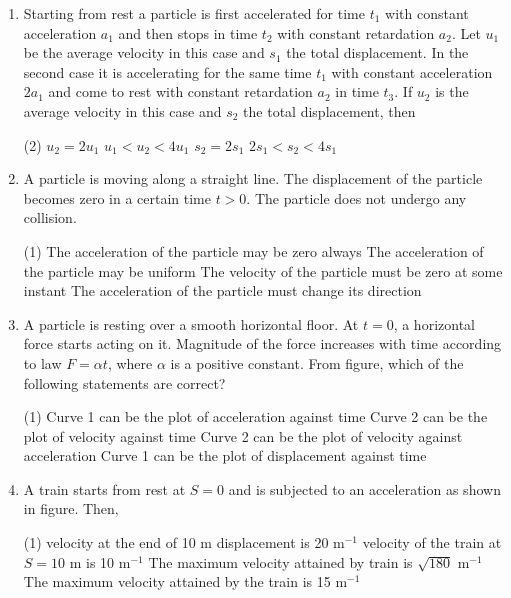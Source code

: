 \documentclass{article}
\begin{document}
\begin{enumerate}
    \item Starting from rest a particle is first accelerated for time \( t_1 \) with constant acceleration \( a_1 \) and then stops in time \( t_2 \) with constant retardation \( a_2 \). Let \( u_1 \) be the average velocity in this case and \( s_1 \) the total displacement. In the second case it is accelerating for the same time \( t_1 \) with constant acceleration \( 2a_1 \) and come to rest with constant retardation \( a_2 \) in time \( t_3 \). If \( u_2 \) is the average velocity in this case and \( s_2 \) the total displacement, then
    \begin{tasks}(2)
        \task \( u_2 = 2u_1 \)
        \task \( u_1 < u_2 < 4u_1 \)
        \task \( s_2 = 2s_1 \)
        \task \( 2s_1 < s_2 < 4s_1 \)
    \end{tasks}

    \item A particle is moving along a straight line. The displacement of the particle becomes zero in a certain time \( t > 0 \). The particle does not undergo any collision.
    \begin{tasks}(1)
        \task The acceleration of the particle may be zero always
        \task The acceleration of the particle may be uniform
        \task The velocity of the particle must be zero at some instant
        \task The acceleration of the particle must change its direction
    \end{tasks}

    \item A particle is resting over a smooth horizontal floor. At \(t = 0\), a horizontal force starts acting on it. Magnitude of the force increases with time according to law \(F = \alpha t\), where \(\alpha\) is a positive constant. From figure, which of the following statements are correct?
    \begin{tasks}(1)
      \task Curve 1 can be the plot of acceleration against time
      \task Curve 2 can be the plot of velocity against time
      \task Curve 2 can be the plot of velocity against acceleration
      \task Curve 1 can be the plot of displacement against time
    \end{tasks}
    
    \item A train starts from rest at \(S = 0\) and is subjected to an acceleration as shown in figure. Then,
    \begin{tasks}(1)
      \task velocity at the end of 10 m displacement is 20 m\(^{-1}\)
      \task velocity of the train at \(S = 10\) m is 10 m\(^{-1}\)
      \task The maximum velocity attained by train is \(\sqrt{180}\) m\(^{-1}\)
      \task The maximum velocity attained by the train is 15 m\(^{-1}\)
    \end{tasks}
    

\end{enumerate}
\end{document}
